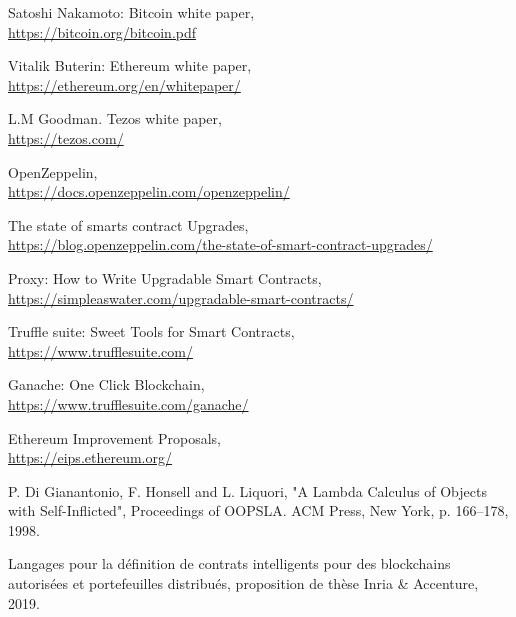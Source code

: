 \begin{thebibliography}{9}

Satoshi Nakamoto: Bitcoin white paper,
\\\url{https://bitcoin.org/bitcoin.pdf}

Vitalik Buterin: Ethereum white paper,
\\\url{https://ethereum.org/en/whitepaper/}

L.M Goodman. Tezos white paper,
\\\url{https://tezos.com/}

OpenZeppelin,
\\\url{https://docs.openzeppelin.com/openzeppelin/}

The state of smarts contract Upgrades,
\\\url{https://blog.openzeppelin.com/the-state-of-smart-contract-upgrades/}

Proxy: How to Write Upgradable Smart Contracts,
\\\url{https://simpleaswater.com/upgradable-smart-contracts/}


Truffle suite: Sweet Tools for Smart Contracts,
\\\url{https://www.trufflesuite.com/}

Ganache: One Click Blockchain,
\\\url{https://www.trufflesuite.com/ganache/}


Ethereum Improvement Proposals,
\\\url{https://eips.ethereum.org/}

P. Di Gianantonio, F. Honsell and L. Liquori, "A Lambda Calculus of Objects with Self-Inflicted", Proceedings of OOPSLA. ACM Press, New York, p. 166–178, 1998.

Langages pour la définition de contrats intelligents  pour des blockchains autorisées et portefeuilles distribués, proposition de thèse Inria \& Accenture, 2019.

\end{thebibliography}



